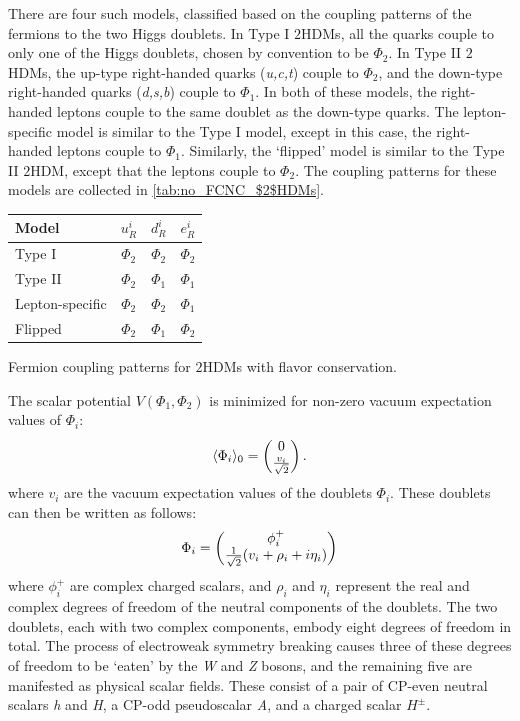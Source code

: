 There are four such models, classified based on the coupling patterns of the fermions to the two Higgs doublets. In Type I $2$HDMs, all the quarks couple to only one of the Higgs doublets, chosen by convention to be $\Phi_2$. In Type II $2$HDMs, the up-type right-handed quarks (\emph{u,c,t}) couple to $\Phi_2$, and the down-type right-handed quarks (\emph{d,s,b}) couple to $\Phi_1$. In both of these models, the right-handed leptons couple to the same doublet as the down-type quarks. The lepton-specific model is similar to the Type I model, except in this case, the right-handed leptons couple to $\Phi_1$. Similarly, the `flipped' model is similar to the Type II $2$HDM, except that the leptons couple to $\Phi_2$. The coupling patterns for these models are collected in \autoref{tab:no_FCNC_$2$HDMs}.
\begin{margintable}[0.5cm]
\small{
  \begin{tabular}{lccc}
	\toprule
    Model & $u_R^i$ & $d_R^i$  & $e_R^i$\\
    \midrule
    Type I          & $\Phi_2$ & $\Phi_2$ & $\Phi_2$\\
    Type II         & $\Phi_2$ & $\Phi_1$ & $\Phi_1$\\
    Lepton-specific & $\Phi_2$ & $\Phi_2$ & $\Phi_1$\\
    Flipped         & $\Phi_2$ & $\Phi_1$ & $\Phi_2$\\
    \bottomrule
  \end{tabular}}
  \caption{Fermion coupling patterns for $2$HDMs with flavor conservation.}
  \label{tab:no_FCNC_$2$HDMs}
\end{margintable}
\noindent The scalar potential $V(\Phi_1,\Phi_2)$ is minimized for non-zero vacuum expectation values of $\Phi_i$:
\begin{align}
\langle\Phi_i\rangle_0=\begin{pmatrix} 0 \\ \frac{v_i}{\sqrt{2}}\end{pmatrix}.
\end{align}
where $v_i$ are the vacuum expectation values of the doublets $\Phi_i$. These doublets can then be written as follows:
\begin{equation}\label{eq:2HDM_doublet_components}
\Phi_i = \begin{pmatrix} \phi_i^+ \\ \frac{1}{\sqrt{2}}(v_i+\rho_i+i\eta_i)\end{pmatrix}
\end{equation}
where $\phi_i^+$ are complex charged scalars, and $\rho_i$ and $\eta_i$ represent the real and complex degrees of freedom of the neutral components of the doublets. The two doublets, each with two complex components, embody eight degrees of freedom in total. 
The process of electroweak symmetry breaking causes three of these degrees of freedom to be `eaten' by the \emph{W} and \emph{Z} bosons, and the remaining five are manifested as physical scalar fields. These consist of a pair of CP-even neutral scalars \emph{h} and \emph{H}, a CP-odd pseudoscalar \emph{A}, and a charged scalar $H^\pm$.

